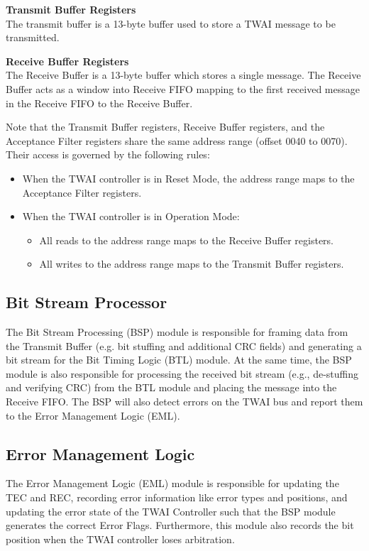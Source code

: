 \documentclass[main\_\_EN.tex]{subfiles}
\begin{document}
{\bfseries Transmit Buffer Registers}\\
The transmit buffer is a 13-byte buffer used to store a TWAI message to be transmitted.

{\bfseries Receive Buffer Registers}\\
The Receive Buffer is a 13-byte buffer which stores a single message. The Receive Buffer acts as a window into Receive FIFO mapping to the first received message in the Receive FIFO to the Receive Buffer.

Note that the Transmit Buffer registers, Receive Buffer registers, and the Acceptance Filter registers share the same address range (offset \hexprefix{}0040 to \hexprefix{}0070). Their access is governed by the following rules:

\begin{itemize}
    \item When the TWAI controller is in Reset Mode, the address range maps to the Acceptance Filter registers.
    \item When the TWAI controller is in Operation Mode:
    \begin{itemize}
        \item All reads to the address range maps to the Receive Buffer registers.
        \item All writes to the address range maps to the Transmit Buffer registers.
    \end{itemize}
\end{itemize}

\subsection{Bit Stream Processor}
The Bit Stream Processing (BSP) module is responsible for framing data from the Transmit Buffer (e.g. bit stuffing and additional CRC fields) and generating a bit stream for the Bit Timing Logic (BTL) module. At the same time, the BSP module is also responsible for processing the received bit stream (e.g., de-stuffing and verifying CRC) from the BTL module and placing the message into the Receive FIFO. The BSP will also detect errors on the TWAI bus and report them to the Error Management Logic (EML).


\subsection{Error Management Logic}
The Error Management Logic (EML) module is responsible for updating the TEC and REC, recording error information like error types and positions, and updating the error state of the TWAI Controller such that the BSP module generates the correct Error Flags. Furthermore, this module also records the bit position when the TWAI controller loses arbitration.
\end{document}
